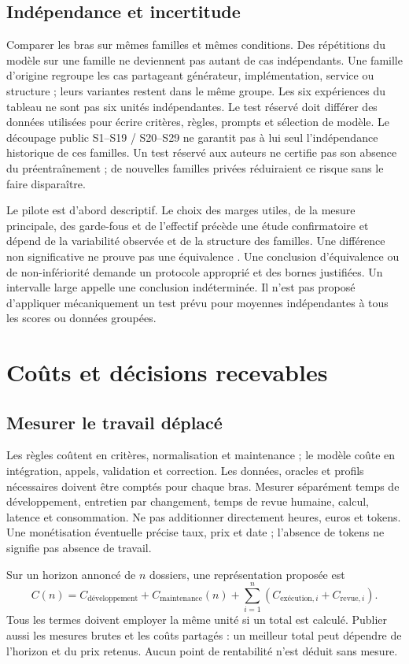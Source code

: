 \documentclass[11pt,a4paper]{article}
\begin{document}
\subsection{Indépendance et incertitude}
Comparer les bras sur mêmes familles et mêmes conditions. Des répétitions du
modèle sur une famille ne deviennent pas autant de cas indépendants. Une
famille d'origine regroupe les cas partageant générateur, implémentation,
service ou structure ; leurs variantes restent dans le même groupe. Les six
expériences du tableau ne sont pas six unités indépendantes. Le test
réservé doit différer des données utilisées pour écrire critères, règles,
prompts et sélection de modèle. Le découpage public S1--S19 / S20--S29 ne
garantit pas à lui seul l'indépendance historique de ces familles.
Un test réservé aux auteurs ne certifie pas son absence du préentraînement ;
de nouvelles familles privées réduiraient ce risque sans le faire disparaître.

Le pilote est d'abord descriptif. Le choix des marges utiles, de la mesure
principale, des garde-fous et de l'effectif précède une étude confirmatoire et
dépend de la variabilité observée et de la structure des familles. Une différence
non significative ne prouve pas une équivalence \cite{lakens}. Une conclusion
d'équivalence ou de non-infériorité demande un protocole approprié et des bornes
justifiées. Un intervalle large appelle une conclusion indéterminée. Il n'est
pas proposé d'appliquer mécaniquement un test prévu pour moyennes indépendantes
à tous les scores ou données groupées.

\section{Coûts et décisions recevables}
\subsection{Mesurer le travail déplacé}
Les règles coûtent en critères, normalisation et maintenance ; le modèle coûte
en intégration, appels, validation et correction. Les données, oracles et
profils nécessaires doivent être comptés pour chaque bras. Mesurer séparément
temps de développement, entretien par changement, temps de revue humaine,
calcul, latence et consommation. Ne pas additionner directement heures, euros
et tokens. Une monétisation éventuelle précise taux, prix et date ; l'absence
de tokens ne signifie pas absence de travail.

Sur un horizon annoncé de $n$ dossiers, une représentation proposée est
\[
C(n)=C_{\text{développement}}+C_{\text{maintenance}}(n)
       +\sum_{i=1}^{n}(C_{\text{exécution},i}+C_{\text{revue},i}).
\]
Tous les termes doivent employer la même unité si un total est calculé.
Publier aussi les mesures brutes et les coûts partagés : un meilleur total
peut dépendre de l'horizon et du prix retenus. Aucun point de rentabilité
n'est déduit sans mesure.
\end{document}
